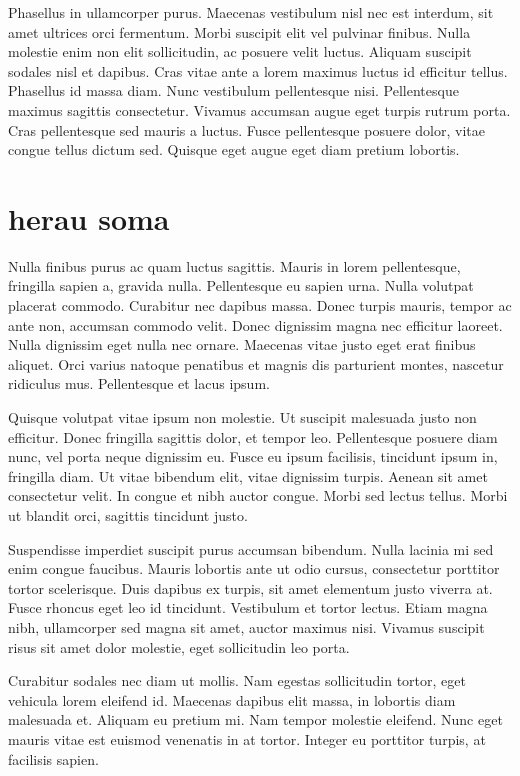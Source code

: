 Phasellus in ullamcorper purus. 
Maecenas vestibulum nisl nec est interdum, sit amet ultrices orci fermentum. 
Morbi suscipit elit vel pulvinar finibus. 
Nulla molestie enim non elit sollicitudin, ac posuere velit luctus. 
Aliquam suscipit sodales nisl et dapibus. 
Cras vitae ante a lorem maximus luctus id efficitur tellus. 
Phasellus id massa diam. 
Nunc vestibulum pellentesque nisi. 
Pellentesque maximus sagittis consectetur. 
Vivamus accumsan augue eget turpis rutrum porta. 
Cras pellentesque sed mauris a luctus. 
Fusce pellentesque posuere dolor, vitae congue tellus dictum sed. 
Quisque eget augue eget diam pretium lobortis.

\section{herau soma}
Nulla finibus purus ac quam luctus sagittis. 
Mauris in lorem pellentesque, fringilla sapien a, gravida nulla. 
Pellentesque eu sapien urna. 
Nulla volutpat placerat commodo. 
Curabitur nec dapibus massa. 
Donec turpis mauris, tempor ac ante non, accumsan commodo velit. 
Donec dignissim magna nec efficitur laoreet. 
Nulla dignissim eget nulla nec ornare. 
Maecenas vitae justo eget erat finibus aliquet. 
Orci varius natoque penatibus et magnis dis parturient montes, nascetur ridiculus mus. 
Pellentesque et lacus ipsum.

Quisque volutpat vitae ipsum non molestie. 
Ut suscipit malesuada justo non efficitur. 
Donec fringilla sagittis dolor, et tempor leo. 
Pellentesque posuere diam nunc, vel porta neque dignissim eu. 
Fusce eu ipsum facilisis, tincidunt ipsum in, fringilla diam. 
Ut vitae bibendum elit, vitae dignissim turpis. 
Aenean sit amet consectetur velit. 
In congue et nibh auctor congue. 
Morbi sed lectus tellus. 
Morbi ut blandit orci, sagittis tincidunt justo.

Suspendisse imperdiet suscipit purus accumsan bibendum. 
Nulla lacinia mi sed enim congue faucibus. 
Mauris lobortis ante ut odio cursus, consectetur porttitor tortor scelerisque. 
Duis dapibus ex turpis, sit amet elementum justo viverra at. 
Fusce rhoncus eget leo id tincidunt. 
Vestibulum et tortor lectus. 
Etiam magna nibh, ullamcorper sed magna sit amet, auctor maximus nisi. 
Vivamus suscipit risus sit amet dolor molestie, eget sollicitudin leo porta.

Curabitur sodales nec diam ut mollis. 
Nam egestas sollicitudin tortor, eget vehicula lorem eleifend id. 
Maecenas dapibus elit massa, in lobortis diam malesuada et. 
Aliquam eu pretium mi. 
Nam tempor molestie eleifend. 
Nunc eget mauris vitae est euismod venenatis in at tortor. 
Integer eu porttitor turpis, at facilisis sapien.

